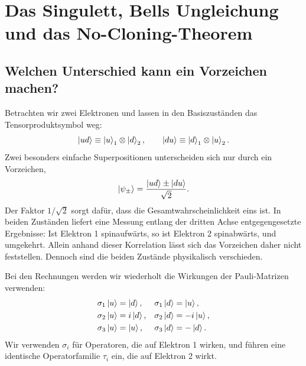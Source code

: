 \chapter{Das Singulett, Bells Ungleichung und das No-Cloning-Theorem}


\section{Welchen Unterschied kann ein Vorzeichen machen?}

Betrachten wir zwei Elektronen und lassen in den Basiszuständen das Tensorproduktsymbol weg:
\begin{equation}
  \left\lvert ud\right\rangle\equiv\left\lvert u\right\rangle_1\otimes\left\lvert d\right\rangle_2,
  \qquad
  \left\lvert du\right\rangle\equiv\left\lvert d\right\rangle_1\otimes\left\lvert u\right\rangle_2.
\end{equation}
Zwei besonders einfache Superpositionen unterscheiden sich nur durch ein Vorzeichen,
\begin{equation}
  \left\lvert\psi_\pm\right\rangle
  =
  \frac{\left\lvert ud\right\rangle\pm\left\lvert du\right\rangle}{\sqrt2}.
  \label{eq:l05-two-signs}
\end{equation}
Der Faktor \(1/\sqrt2\) sorgt dafür, dass die Gesamtwahrscheinlichkeit eins ist. In beiden Zuständen liefert eine Messung entlang der dritten Achse entgegengesetzte Ergebnisse: Ist Elektron 1 spinaufwärts, so ist Elektron 2 spinabwärts, und umgekehrt. Allein anhand dieser Korrelation lässt sich das Vorzeichen daher nicht feststellen. Dennoch sind die beiden Zustände physikalisch verschieden.

Bei den Rechnungen werden wir wiederholt die Wirkungen der Pauli-Matrizen verwenden:
\begin{align}
  \sigma_1\left\lvert u\right\rangle&=\left\lvert d\right\rangle,&
  \sigma_1\left\lvert d\right\rangle&=\left\lvert u\right\rangle,\nonumber\\
  \sigma_2\left\lvert u\right\rangle&=i\left\lvert d\right\rangle,&
  \sigma_2\left\lvert d\right\rangle&=-i\left\lvert u\right\rangle,\nonumber\\
  \sigma_3\left\lvert u\right\rangle&=\left\lvert u\right\rangle,&
  \sigma_3\left\lvert d\right\rangle&=-\left\lvert d\right\rangle.
  \label{eq:l05-pauli-actions}
\end{align}
Wir verwenden \(\sigma_i\) für Operatoren, die auf Elektron 1 wirken, und führen eine identische Operatorfamilie \(\tau_i\) ein, die auf Elektron 2 wirkt.

